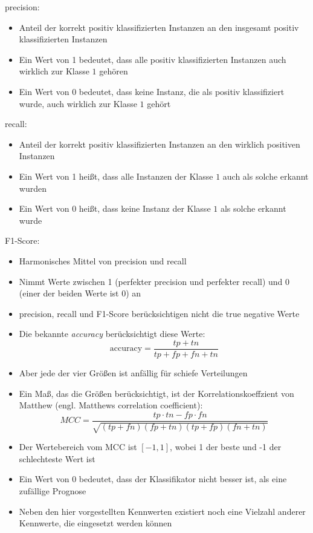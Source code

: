 \begin{frame}
precision: 
\begin{itemize}[<+->]
\item Anteil der korrekt positiv klassifizierten Instanzen an den insgesamt positiv klassifizierten Instanzen
\item Ein Wert von 1 bedeutet, dass alle positiv klassifizierten Instanzen auch wirklich zur Klasse $1$ gehören
\item Ein Wert von 0 bedeutet, dass keine Instanz, die als positiv klassifiziert wurde, auch wirklich zur Klasse $1$ gehört
\end{itemize}
recall:
\begin{itemize}[<+->]
\item Anteil der korrekt positiv klassifizierten Instanzen an den wirklich positiven Instanzen
\item Ein Wert von 1 heißt, dass alle Instanzen der Klasse $1$ auch als solche erkannt wurden
\item Ein Wert von 0 heißt, dass keine Instanz der Klasse $1$ als solche erkannt wurde
\end{itemize}
F1-Score:
\begin{itemize}[<+->]
\item Harmonisches Mittel von precision und recall
\item Nimmt Werte zwischen 1 (perfekter precision und perfekter recall) und 0 (einer der beiden Werte ist 0) an
\end{itemize}
\end{frame}
\begin{frame}
\begin{itemize}[<+->]
\item precision, recall und F1-Score berücksichtigen nicht die true negative Werte
\item Die bekannte \textit{accuracy} berücksichtigt diese Werte:
\[ \text{accuracy} = \frac{tp+tn}{tp+fp+fn+tn} \]
\item Aber jede der vier Größen ist anfällig für schiefe Verteilungen
\item Ein Maß, das die Größen berücksichtigt, ist der Korrelationskoeffzient von Matthew (engl. Matthews correlation coefficient):
\[
MCC = \frac{tp\cdot tn - fp\cdot fn}{\sqrt{(tp+fn)(fp+tn)(tp+fp)(fn+tn)}}
\]
\item Der Wertebereich vom MCC ist $[-1,1]$, wobei 1 der beste und -1 der schlechteste Wert ist
\item Ein Wert von 0 bedeutet, dass der Klassifikator nicht besser ist, als eine zufällige Prognose
\item Neben den hier vorgestellten Kennwerten existiert noch eine Vielzahl anderer Kennwerte, die eingesetzt werden können
\end{itemize}
\end{frame}
